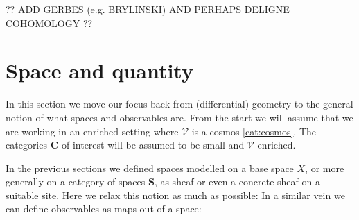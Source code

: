     ?? ADD GERBES (e.g. BRYLINSKI) AND PERHAPS DELIGNE COHOMOLOGY ??

\section{Space and quantity}

    In this section we move our focus back from (differential) geometry to the general notion of what spaces and observables are. From the start we will assume that we are working in an enriched setting where $\mathcal{V}$ is a cosmos \ref{cat:cosmos}. The categories $\mathbf{C}$ of interest will be assumed to be small and $\mathcal{V}$-enriched.

    In the previous sections we defined spaces modelled on a base space $X$, or more generally on a category of spaces $\mathbf{S}$, as sheaf or even a concrete sheaf on a suitable site. Here we relax this notion as much as possible:
    In a similar vein we can define observables as maps out of a space:

